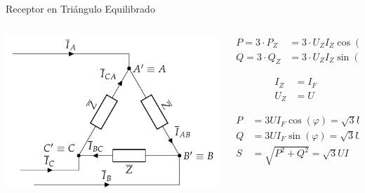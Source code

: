 \documentclass[aspectratio=169, usenames,svgnames,dvipsnames]{beamer}
\begin{document}
\begin{frame}[label={sec:org0b9212b}]{Receptor en Triángulo Equilibrado}
\begin{columns}
\begin{column}{0.5\columnwidth}
\begin{center}
\includegraphics[width=.9\linewidth]{../figs/TrianguloEquilibrado_Receptor.pdf}
\end{center}
\end{column}

\begin{column}{0.5\columnwidth}
\begin{align*}
  P = 3 \cdot P_Z &= 3 \cdot U_Z I_Z \cos(\varphi)\\
  Q = 3 \cdot Q_Z &= 3 \cdot U_Z I_Z \sin(\varphi)
\end{align*}

\begin{align*}
  I_Z &= I_F\\
  U_Z &= U
\end{align*}


\begin{align*}
  P &= 3 U I_F \cos(\varphi) = \sqrt{3} U I \cos(\varphi)\\
  Q &= 3 U I_F \sin(\varphi) = \sqrt{3} U I \sin(\varphi)\\
  S &= \sqrt{P^2 + Q^2} =  \sqrt{3} U I
\end{align*}
\end{column}
\end{columns}
\end{frame}
\end{document}
